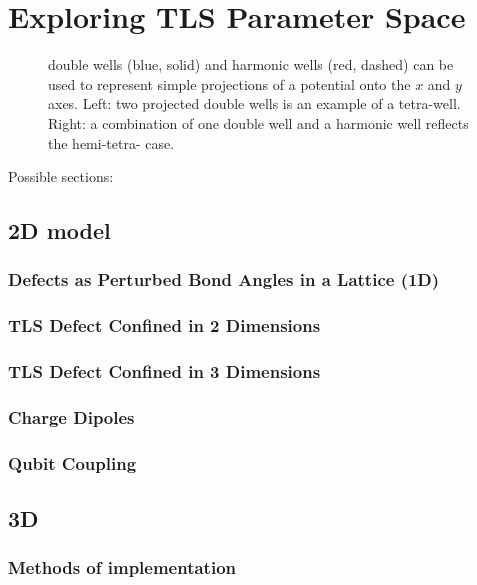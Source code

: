 \versoimage
\chapter{Exploring TLS Parameter Space}\label{ch:implementation}

\begin{figure}[htp]
\centering
\resizebox{0.8\columnwidth}{!}{}
\caption[Potential Projections]{\label{fig:mexhatproj} double wells (blue, solid) and harmonic wells (red, dashed) can be used to represent simple projections of a  potential onto the $x$ and $y$ axes. Left: two projected double wells is an example of a tetra-well. Right: a combination of one double well and a harmonic well reflects the hemi-tetra- case.}
\end{figure}

Possible sections:

\section{2D model}\label{sec:2d}
\subsection{Defects as Perturbed Bond Angles in a Lattice (1D)}
\subsection{TLS Defect Confined in 2 Dimensions}
\subsection{TLS Defect Confined in 3 Dimensions}
\subsection{Charge Dipoles}
\subsection{Qubit Coupling}
\section{3D}
\subsection{Methods of implementation}
